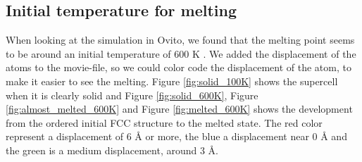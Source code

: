 \subsection{Initial temperature for melting}

When looking at the simulation in Ovito, we found that the melting point seems to be around an initial temperature of 600 K \cite{ovito}. We added the displacement of the atoms to the movie-file, so we could color code the displacement of the atom, to make it easier to see the melting. Figure \ref{fig:solid_100K} shows the supercell when it is clearly solid and Figure \ref{fig:solid_600K}, Figure \ref{fig:almost_melted_600K} and Figure \ref{fig:melted_600K} shows the development from the ordered initial FCC structure to the melted state. The red color represent a displacement of 6 Å or more, the blue a displacement near 0 Å and the green is a medium displacement, around 3 Å. 

